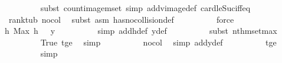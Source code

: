 \begin{isabellebody}
\ \ \ \ \ \ \ \ \isamarkupfalse%
\ {\isacharparenleft}{\kern0pt}subst\ count{\isacharunderscore}{\kern0pt}image{\isacharunderscore}{\kern0pt}mset{\isacharcomma}{\kern0pt}\ simp\ add{\isacharcolon}{\kern0pt}vimage{\isacharunderscore}{\kern0pt}def\ card{\isacharunderscore}{\kern0pt}le{\isacharunderscore}{\kern0pt}Suc{}{\isacharunderscore}{\kern0pt}iff{\isacharunderscore}{\kern0pt}eq{\isacharparenright}{\kern0pt}\isanewline
\ \ \ \ \ \ \ \ \isamarkupfalse%
\ \ rank{\isacharunderscore}{\kern0pt}t{\isacharunderscore}{\kern0pt}ub{\isacharprime}{\kern0pt}\ no{\isacharunderscore}{\kern0pt}col\ \isamarkupfalse%
\ {\isacharparenleft}{\kern0pt}subst\ {\isacharparenleft}{\kern0pt}asm{\isacharparenright}{\kern0pt}\ has{\isacharunderscore}{\kern0pt}no{\isacharunderscore}{\kern0pt}collision{\isacharunderscore}{\kern0pt}def{\isacharparenright}{\kern0pt}\isanewline
\ \ \ \ \ \ \ \ \isamarkupfalse%
\ force\isanewline
\isanewline
\ \ \ \ \ \ \isamarkupfalse%
\ h{\isacharunderscore}{\kern0pt}{}{\isacharcolon}{\kern0pt}\ {\isachardoublequoteopen}Max\ {\isacharparenleft}{\kern0pt}h\ {\isasymomega}{\isacharparenright}{\kern0pt}\ {\isacharequal}{\kern0pt}\ y{\isacharprime}{\kern0pt}{\isachardoublequoteclose}\isanewline
\ \ \ \ \ \ \ \ \isamarkupfalse%
\ {\isacharparenleft}{\kern0pt}simp\ add{\isacharcolon}{\kern0pt}h{\isacharunderscore}{\kern0pt}def\ y{\isacharprime}{\kern0pt}{\isacharunderscore}{\kern0pt}def{\isacharparenright}{\kern0pt}\isanewline
\ \ \ \ \ \ \ \ \isamarkupfalse%
\ {\isacharparenleft}{\kern0pt}subst\ nth{\isacharunderscore}{\kern0pt}mset{\isacharunderscore}{\kern0pt}max{\isacharparenright}{\kern0pt}\isanewline
\ \ \ \ \ \ \ \ \isamarkupfalse%
\ True\ t{\isacharunderscore}{\kern0pt}ge{\isacharunderscore}{\kern0pt}{}\ \isamarkupfalse%
\ simp\isanewline
\ \ \ \ \ \ \ \ \isamarkupfalse%
\ no{\isacharunderscore}{\kern0pt}col{\isacharprime}{\kern0pt}\ \isamarkupfalse%
\ {\isacharparenleft}{\kern0pt}simp\ add{\isacharcolon}{\kern0pt}y{\isacharprime}{\kern0pt}{\isacharunderscore}{\kern0pt}def{\isacharparenright}{\kern0pt}\isanewline
\ \ \ \ \ \ \ \ \isamarkupfalse%
\ t{\isacharunderscore}{\kern0pt}ge{\isacharunderscore}{\kern0pt}{}\isanewline
\ \ \ \ \ \ \ \ \isamarkupfalse%
\ simp\isanewline
\isanewline
\ \ \ \ \ \ \isamarkupfalse%

\end{isabellebody}
